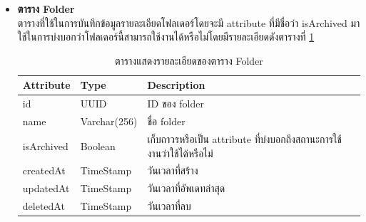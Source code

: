\documentclass[12pt,oneside,openright,a4paper]{cpe-thai-project}
\begin{document}
\begin{itemize}
\item \textbf{ตาราง Folder}\\
ตารางที่ใช้ในการบันทึกข้อมูลรายละเอียดโฟลเดอร์โดยจะมี attribute ที่มีชื่อว่า isArchived มาใช้ในการบ่งบอกว่าโฟลเดอร์นี้สามารถใช้งานได้หรือไม่โดยมีรายละเอียดดังตารางที่ \ref{tbl:dbFolder}
\begin{table}[!ht]
    \centering
    \begin{tabular}{|p{4cm}|p{2cm}|p{6cm}|}
    \hline
    \textbf{Attribute} & \textbf{Type} & \textbf{Description}   \\ \hline
    id        & UUID        & ID ของ folder          \\ \hline
    name      & Varchar(256) & ชื่อ folder            \\ \hline
    isArchived         & Boolean          & เก็บถาวรหรือเป็น attribute ที่บ่งบอกถึงสถานะการใช้งานว่าใช้ได้หรือไม่ \\ \hline
    createdAt & TimeStamp   & วันเวลาที่สร้าง        \\ \hline
    updatedAt & TimeStamp   & วันเวลาที่อัพเดทล่าสุด \\ \hline
    deletedAt & TimeStamp   & วันเวลาที่ลบ             \\ \hline
    \end{tabular}
    \caption{\centering  ตารางแสดงรายละเอียดของตาราง Folder} \label{tbl:dbFolder}
\end{table}


\end{itemize}
\end{document}
